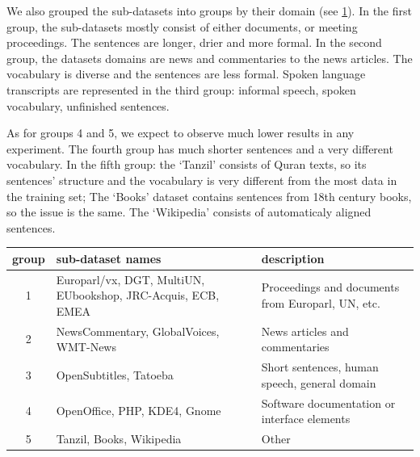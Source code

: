 We also grouped the sub-datasets into groups by their domain
(see \cref{tab:subdatasets_groups}).
In the first group, the sub-datasets mostly consist of
either documents, or meeting proceedings.
The sentences are longer, drier and more formal.
In the second group, the datasets domains are news and
commentaries to the news articles.
The vocabulary is diverse and the sentences are less formal.
Spoken language transcripts are represented in the third group:
informal speech, spoken vocabulary, unfinished sentences.

As for groups 4 and 5, we expect to observe much lower results
in any experiment. The fourth group has much shorter sentences
and a very different vocabulary.
In the fifth group: the `Tanzil' consists of Quran texts, so its sentences'
structure and the vocabulary is very different from the most data in the training set;
The `Books' dataset contains sentences from 18th century books, so the issue is the same.
The `Wikipedia' consists of automaticaly aligned sentences.


\begin{table}[h!]
	\centering
	\begin{tabular}{c|p{}|p{}}
	\toprule
	     group & sub-dataset names  & description \\
	\midrule
	 1 &  Europarl/vx, DGT, MultiUN, EUbookshop, JRC-Acquis,
	      ECB, EMEA
	   &  Proceedings and documents from Europarl, UN, etc. \\
	 2 &  NewsCommentary, GlobalVoices, WMT-News 
	   &  News articles and commentaries \\
	 3 &  OpenSubtitles, Tatoeba
	   &  Short sentences, human speech, general domain \\
	 4 &  OpenOffice, PHP, KDE4, Gnome
	   &  Software documentation or interface elements \\
	 5 &  Tanzil, Books, Wikipedia
	   &  Other  \\
	\bottomrule
	\end{tabular}

	\label{tab:subdatasets_groups}
\end{table}

